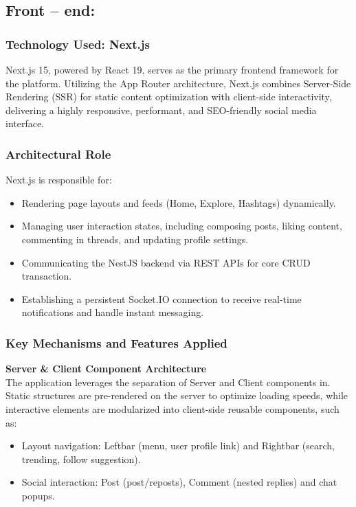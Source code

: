 \subsection{Front -- end:}

\subsubsection{Technology Used: Next.js}

Next.js 15, powered by React 19, serves as the primary frontend framework for the platform. Utilizing the App Router architecture, Next.js combines Server-Side Rendering (SSR) for static content optimization with client-side interactivity, delivering a highly responsive, performant, and SEO-friendly social media interface.

\subsubsection{Architectural Role}

Next.js is responsible for:
\begin{itemize}
  \item Rendering page layouts and feeds (Home, Explore, Hashtags) dynamically.
  \item Managing user interaction states, including composing posts, liking content, commenting in threads, and updating profile settings.
  \item Communicating the NestJS backend via REST APIs for core CRUD transaction.
  \item Establishing a persistent Socket.IO connection to receive real-time notifications and handle instant messaging.
\end{itemize}

\subsubsection{Key Mechanisms and Features Applied}

\medskip\noindent\textbf{Server \& Client Component Architecture}\\[2pt]

The application leverages the separation of Server and Client components in. Static structures are pre-rendered on the server to optimize loading speeds, while interactive elements are modularized into client-side reusable components, such as:
\begin{itemize}
  \item Layout navigation: Leftbar (menu, user profile link) and Rightbar (search, trending, follow suggestion).
  \item Social interaction: Post (post/reposts), Comment (nested replies) and chat popups.
\end{itemize}

